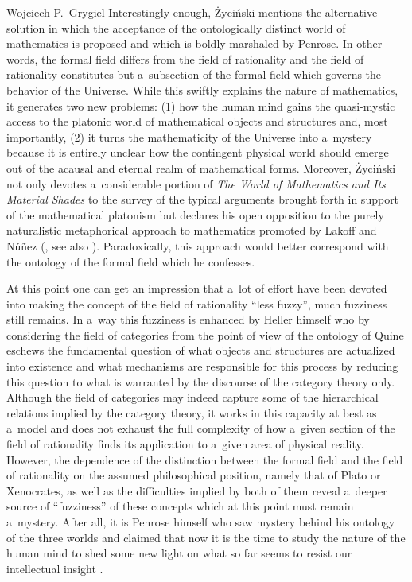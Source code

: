 \begin{artengenv}{Wojciech P.~Grygiel}
Interestingly enough, Życiński mentions the alternative solution in which the acceptance of the ontologically distinct world of mathematics is proposed and which is boldly marshaled by Penrose. In other words, the formal field differs from the field of rationality and the field of rationality constitutes but a~subsection of the formal field which governs the behavior of the Universe. While this swiftly explains the nature of mathematics, it generates two new problems: (1) how the human mind gains the quasi-mystic access to the platonic world of mathematical objects and structures and, most importantly, (2) it turns the mathematicity of the Universe into a~mystery because it is entirely unclear how the contingent physical world should emerge out of the acausal and eternal realm of mathematical forms. Moreover, Życiński not only devotes a~considerable portion of \textit{The World of Mathematics and Its Material Shades} to the survey of the typical arguments brought forth in support of the mathematical platonism but declares his open opposition to the purely naturalistic metaphorical approach to mathematics promoted by Lakoff and Núñez
(\cite*[][]{lakoff_where_2000}, see also \cite[][pp.48–49]{zycinski_swiat_2013}). %
 Paradoxically, this approach would better correspond with the ontology of the formal field which he confesses.

At this point one can get an impression that a~lot of effort have been devoted into making the concept of the field of rationality ``less fuzzy'', much fuzziness still remains. In a~way this fuzziness is enhanced by Heller himself who by considering the field of categories from the point of view of the ontology of Quine eschews the fundamental question of what objects and structures are actualized into existence and what mechanisms are responsible for this process by reducing this question to what is warranted by the discourse of the category theory only. Although the field of categories may indeed capture some of the hierarchical relations implied by the category theory, it works in this capacity at best as a~model and does not exhaust the full complexity of how a~given section of the field of rationality finds its application to a~given area of physical reality. However, the dependence of the distinction between the formal field and the field of rationality on the assumed philosophical position, namely that of Plato or Xenocrates, as well as the difficulties implied by both of them reveal a~deeper source of ``fuzziness'' of these concepts which at this point must remain a~mystery. After all, it is Penrose himself who saw mystery behind his ontology of the three worlds and claimed that now it is the time to study the nature of the human mind to shed some new light on what so far seems to resist our intellectual insight
\parencite[][]{brozek_umysl_2014}.%


\end{artengenv}
